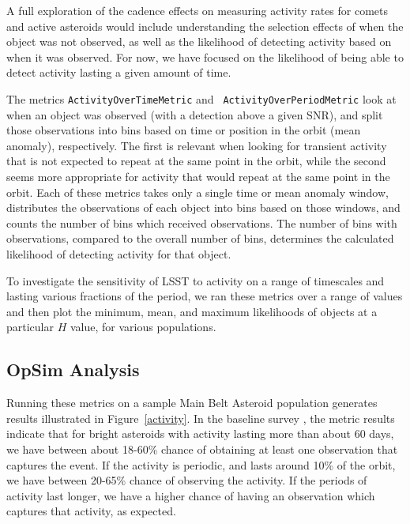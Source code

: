 A full exploration of the cadence effects on measuring activity rates
for comets and active asteroids would include understanding the
selection effects of when the object was not observed, as well as the
likelihood of detecting activity based on when it was observed. For
now, we have focused on the likelihood of being able to detect
activity lasting a given amount of time.

The metrics {\tt ActivityOverTimeMetric} and {\tt
  ActivityOverPeriodMetric} look at when an object was observed (with
a detection above a given SNR), and
split those observations into bins based on time or position in the
orbit (mean anomaly), respectively. The first is relevant when looking
for transient activity that is not expected to repeat at the same
point in the orbit, while the second seems more appropriate for
activity that would repeat at the same point in the orbit. Each of
these metrics takes only a single time or mean anomaly window, distributes
the observations of each object into bins based on those windows, and
counts the number of bins which received observations. The number of
bins with observations, compared to the overall number of bins,
determines the calculated likelihood of detecting activity for that
object.

To investigate the sensitivity of LSST to activity on a range of
timescales and lasting various fractions of the period, we ran these
metrics over a range of values and then plot the minimum, mean, and
maximum likelihoods of objects at a particular $H$ value, for various populations.



\subsection{OpSim Analysis}
\label{sec:\secname:analysis}

Running these metrics on a sample Main Belt Asteroid population
generates results illustrated in Figure~\ref{activity}.
In the baseline survey , the metric results
indicate that for bright asteroids with activity lasting more than
about 60 days, we have between about 18-60\% chance of obtaining at
least one observation that captures the event. If the activity is
periodic, and lasts around 10\% of the orbit, we have between
20-65\% chance of observing the activity. If the periods of activity
last longer, we have a higher chance of having an observation which
captures that activity, as expected.

